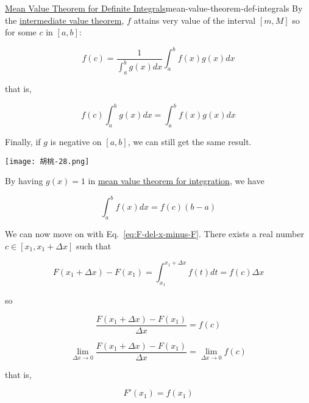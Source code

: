 \begin{Theorem}{\href{https://en.wikipedia.org/wiki/Mean\_value\_theorem\#First\_mean\_value\_theorem\_for\_definite\_integrals}{Mean Value Theorem for Definite Integrals}}{mean-value-theorem-def-integrals}
    By the \href{https://en.wikipedia.org/wiki/Intermediate\_value\_theorem}{intermediate value theorem}, $f$ attains
    very value of the interval $[m, M]$ so for some $c$ in $[a, b]$:

    \begin{equation}
        f(c) = \frac{1}{\int_a^b g(x)dx}\int_a^b f(x)g(x)dx
    \end{equation}

    that is,

    \begin{equation}
        f(c)\int_a^b g(x)dx = \int_a^b f(x)g(x)dx
    \end{equation}

    Finally, if $g$ is negative on $[a, b]$, we can still get the same result.

    \begin{flushright}
        \texttt{[image: 胡桃-28.png]}
    \end{flushright}
\end{Theorem}

By having $g(x) = 1$ in \hyperref[theo:mean-value-theorem-def-integrals]{mean value theorem for integration}, we have

\begin{equation}
    \int_a^b f(x)dx = f(c)(b - a)
\end{equation}

We can now move on with Eq.~\ref{eq:F-del-x-minus-F}. There exists a real number $c \in [x_1, x_1 + \Delta x]$ such that

\begin{equation}
    F(x_1 + \Delta x) - F(x_1) = \int_{x_1}^{x_1 + \Delta x} f(t)dt = f(c)\Delta x
\end{equation}

so

\begin{equation}
    \frac{F(x_1 + \Delta x) - F(x_1)}{\Delta x} = f(c)
\end{equation}

\begin{equation}
    \lim\limits_{\Delta x \rightarrow 0}\frac{F(x_1 + \Delta x) - F(x_1)}{\Delta x} = \lim\limits_{\Delta x \rightarrow 0} f(c)
\end{equation}

that is,

\begin{equation}
    F'(x_1) = f(x_1)
\end{equation}

